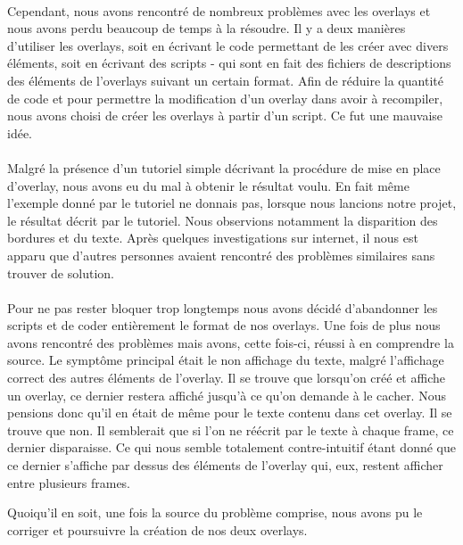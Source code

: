 \paragraph{}
Cependant, nous avons rencontré de nombreux problèmes avec les overlays et
nous avons perdu beaucoup de temps à la résoudre. Il y a deux manières
d'utiliser les overlays, soit en écrivant le code permettant de les créer avec
divers éléments, soit en écrivant des scripts - qui sont en fait des fichiers
de descriptions des éléments de l'overlays suivant un certain format.
Afin de réduire la quantité de code et pour permettre la modification d'un
overlay dans avoir à recompiler, nous avons choisi de créer les overlays à
partir d'un script. Ce fut une mauvaise idée.

\paragraph{}
Malgré la présence d'un tutoriel simple décrivant la procédure de mise en
place d'overlay, nous avons eu du mal à obtenir le résultat voulu. En fait
même l'exemple donné par le tutoriel ne donnais pas, lorsque nous lancions
notre projet, le résultat décrit par le tutoriel. Nous observions notamment la
disparition des bordures et du texte. Après quelques investigations sur
internet, il nous est apparu que d'autres personnes avaient rencontré des
problèmes similaires sans trouver de solution.

\paragraph{}
Pour ne pas rester bloquer trop longtemps nous avons décidé d'abandonner les
scripts et de coder entièrement le format de nos overlays. Une fois de plus
nous avons rencontré des problèmes mais avons, cette fois-ci, réussi à en
comprendre la source. Le symptôme principal était le non affichage du texte,
malgré l'affichage correct des autres éléments de l'overlay. Il se trouve que
lorsqu'on créé et affiche un overlay, ce dernier restera affiché jusqu'à ce
qu'on demande à le cacher. Nous pensions donc qu'il en était de même pour le
texte contenu dans cet overlay. Il se trouve que non. Il semblerait que si
l'on ne réécrit par le texte à chaque frame, ce dernier disparaisse. Ce qui
nous semble totalement contre-intuitif étant donné que ce dernier s'affiche
par dessus des éléments de l'overlay qui, eux, restent afficher entre
plusieurs frames.

Quoiqu'il en soit, une fois la source du problème comprise, nous avons pu
le corriger et poursuivre la création de nos deux overlays.

